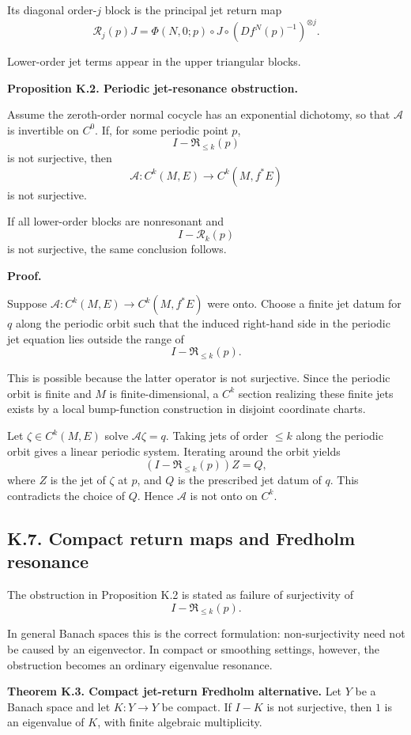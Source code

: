 \documentclass[12pt,a4paper]{article}
\theoremstyle{plain}
\numberwithin{equation}{section}
\numberwithin{theorem}{section}
\begin{document}
Its diagonal order-$j$ block is the principal jet return map
\[
\mathscr R_j(p)J
=
\Phi(N,0;p)
\circ J\circ
(Df^N(p)^{-1})^{\otimes j}.
\]

Lower-order jet terms appear in the upper triangular blocks.

\textbf{Proposition K.2. Periodic jet-resonance obstruction.}

Assume the zeroth-order normal cocycle has an exponential dichotomy, so that $\mathcal A$ is invertible on $C^0$. If, for some periodic point $p$,
\[
I-
\mathfrak R_{\le k}(p)
\]
is not surjective, then
\[
\mathcal A:C^k(M,E)\to C^k(M,f^*E)
\]
is not surjective.

If all lower-order blocks are nonresonant and
\[
I-
\mathscr R_k(p)
\]
is not surjective, the same conclusion follows.

\textbf{Proof.}

Suppose $\mathcal A:C^k(M,E)\to C^k(M,f^*E)$ were onto. Choose a finite jet datum for $q$ along the periodic orbit such that the induced right-hand side in the periodic jet equation lies outside the range of
\[
I-
\mathfrak R_{\le k}(p).
\]

This is possible because the latter operator is not surjective. Since the periodic orbit is finite and $M$ is finite-dimensional, a $C^k$ section realizing these finite jets exists by a local bump-function construction in disjoint coordinate charts.

Let $\zeta\in C^k(M,E)$ solve $\mathcal A\zeta=q$. Taking jets of order $\le k$ along the periodic orbit gives a linear periodic system. Iterating around the orbit yields
\[
(I-
\mathfrak R_{\le k}(p))Z=Q,
\]
where $Z$ is the jet of $\zeta$ at $p$, and $Q$ is the prescribed jet datum of $q$. This contradicts the choice of $Q$. Hence $\mathcal A$ is not onto on $C^k$.

\subsection{K.7. Compact return maps and Fredholm resonance}

The obstruction in Proposition K.2 is stated as failure of surjectivity of
\[
I-\mathfrak R_{\le k}(p).
\]

In general Banach spaces this is the correct formulation: non-surjectivity need not be caused by an eigenvector. In compact or smoothing settings, however, the obstruction becomes an ordinary eigenvalue resonance.

\textbf{Theorem K.3. Compact jet-return Fredholm alternative.} Let $Y$ be a Banach space and let $K:Y\to Y$ be compact. If $I-K$ is not surjective, then $1$ is an eigenvalue of $K$, with finite algebraic multiplicity.
\end{document}
